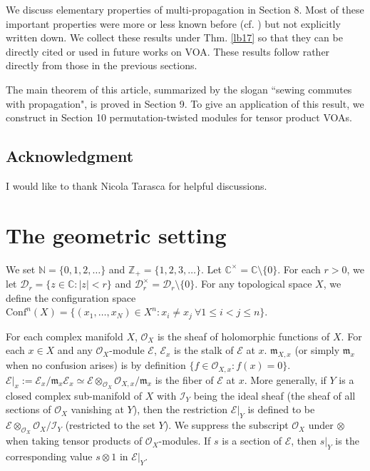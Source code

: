 \documentclass[12pt,a4paper,notitlepage]{article}
\theoremstyle{definition}
\theoremstyle{plain}
\newcommand{\fk}{\mathfrak}
\newcommand{\mc}{\mathcal}
\newcommand{\Conf}{\mathrm{Conf}}
\newcommand{\scr}{\mathscr}
\newcommand{\Cbb}{\mathbb C}
\newcommand{\Nbb}{\mathbb N}
\newcommand{\Zbb}{\mathbb Z}
\numberwithin{equation}{section}
\begin{document}
We discuss elementary properties of multi-propagation in Section 8.  Most of these important properties were more or less known before (cf. \cite{FB04}) but not explicitly written down. We collect these results under Thm. \ref{lb17} so that they can be directly cited or used in future works on VOA. These results follow rather directly from those in the previous sections.

The main theorem of this article, summarized by the slogan ``sewing commutes with propagation", is proved in Section 9. To give an application of this result, we construct in Section 10 permutation-twisted modules for tensor product VOAs.



\subsection*{Acknowledgment}

I would like to thank Nicola Tarasca for helpful discussions.





\section{The geometric setting}\label{lb2}


We set $\Nbb=\{0,1,2,\dots\}$ and $\Zbb_+=\{1,2,3,\dots\}$. Let $\Cbb^\times=\Cbb\setminus\{0\}$. \index{C@$\Cbb^\times$} For each $r>0$, we let $\mc D_r=\{z\in\Cbb:|z|<r\}$ and $\mc D_r^\times=\mc D_r\setminus\{0\}$. \index{Dr@$\mc D_r,\mc D_r^\times$} For any topological space $X$, we define the configuration space $\Conf^n(X)=\{(x_1,\dots,x_N)\in X^n:x_i\neq x_j~\forall 1\leq i<j\leq n\}$. \index{Conf@$\Conf^n(X)$}

For each complex manifold $X$, $\scr O_X$ is the sheaf of holomorphic functions of $X$. For each $x\in X$ and any $\scr O_X$-module $\scr E$, $\scr E_x$ is the stalk of $\scr E$ at $x$. $\fk m_{X,x}$ (or simply $\fk m_x$ when no confusion arises)  is by definition $\{f\in\scr O_{X,x}:f(x)=0\}$. $\scr E|_x:=\scr E_x/\fk m_x\scr E_x\simeq\scr E\otimes_{\scr O_X}\scr O_{X,x}/\fk m_x$ is the fiber of $\scr E$ at $x$. More generally, if $Y$ is a closed complex sub-manifold of $X$ with $\scr I_Y$ being the ideal sheaf (the sheaf of all sections of $\scr O_X$ vanishing at $Y$), then the restriction $\scr E|_Y$ is defined to be $\scr E\otimes_{\scr O_X}\scr O_X/\scr I_Y$ (restricted to the set $Y$). We suppress the subscript $\scr O_X$ under $\otimes$ when taking tensor products of $\scr O_X$-modules. If $s$ is a section of $\scr E$, then $s|_Y$ is the corresponding value $s\otimes 1$ in $\scr E|_Y$. 
\end{document}
